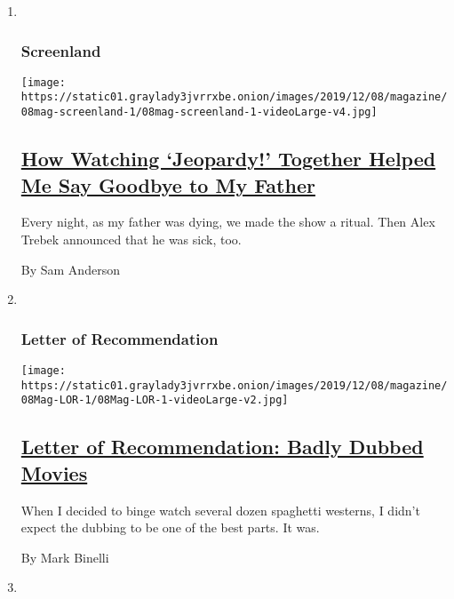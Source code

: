 \begin{enumerate}
\def\labelenumi{\arabic{enumi}.}
\item ~
  \hypertarget{screenland}{%
  \subsubsection{Screenland}\label{screenland}}

  \texttt{[image: https://static01.graylady3jvrrxbe.onion/images/2019/12/08/magazine/08mag-screenland-1/08mag-screenland-1-videoLarge-v4.jpg]}

  \hypertarget{how-watching-jeopardy-together-helped-me-say-goodbye-to-my-father}{%
  \subsection{\texorpdfstring{\href{/2019/12/04/magazine/jeopardy-alex-trebek-cancer.html}{How
  Watching `Jeopardy!' Together Helped Me Say Goodbye to My
  Father}}{How Watching `Jeopardy!' Together Helped Me Say Goodbye to My Father}}\label{how-watching-jeopardy-together-helped-me-say-goodbye-to-my-father}}

  Every night, as my father was dying, we made the show a ritual. Then
  Alex Trebek announced that he was sick, too.

  By Sam Anderson
\item ~
  \hypertarget{letter-of-recommendation}{%
  \subsubsection{Letter of
  Recommendation}\label{letter-of-recommendation}}

  \texttt{[image: https://static01.graylady3jvrrxbe.onion/images/2019/12/08/magazine/08Mag-LOR-1/08Mag-LOR-1-videoLarge-v2.jpg]}

  \hypertarget{letter-of-recommendation-badly-dubbed-movies}{%
  \subsection{\texorpdfstring{\href{/2019/12/03/magazine/spaghetti-westerns-dubbing.html}{Letter
  of Recommendation: Badly Dubbed
  Movies}}{Letter of Recommendation: Badly Dubbed Movies}}\label{letter-of-recommendation-badly-dubbed-movies}}

  When I decided to binge watch several dozen spaghetti westerns, I
  didn't expect the dubbing to be one of the best parts. It was.

  By Mark Binelli
\item ~
  \hypertarget{eat}{%
}
\end{enumerate}
